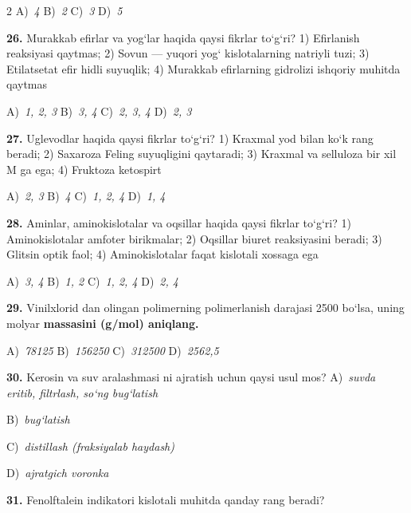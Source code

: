 \documentclass[11pt,a4paper]{article}
\begin{document}
\begin{multicols}{2}
\noindent A)~\textsl{4} \hfill B)~\textsl{2} \hfill C)~\textsl{3} \hfill D)~\textsl{5}\par
\vspace{4pt}
\noindent\textbf{26.} Murakkab efirlar va yog`lar haqida qaysi fikrlar to`g`ri? 1) Efirlanish reaksiyasi qaytmas; 2) Sovun --- yuqori yog` kislotalarning natriyli tuzi; 3) Etilatsetat efir hidli suyuqlik; 4) Murakkab efirlarning gidrolizi ishqoriy muhitda qaytmas

\noindent A)~\textsl{1, 2, 3} \hfill B)~\textsl{3, 4} \hfill C)~\textsl{2, 3, 4} \hfill D)~\textsl{2, 3}\par
\vspace{4pt}
\noindent\textbf{27.} Uglevodlar haqida qaysi fikrlar to`g`ri? 1) Kraxmal yod bilan ko`k rang beradi; 2) Saxaroza Feling suyuqligini qaytaradi; 3) Kraxmal va selluloza bir xil M ga ega; 4) Fruktoza ketospirt

\noindent A)~\textsl{2, 3} \hfill B)~\textsl{4} \hfill C)~\textsl{1, 2, 4} \hfill D)~\textsl{1, 4}\par
\vspace{4pt}
\noindent\textbf{28.} Aminlar, aminokislotalar va oqsillar haqida qaysi fikrlar to`g`ri? 1) Aminokislotalar amfoter birikmalar; 2) Oqsillar biuret reaksiyasini beradi; 3) Glitsin optik faol; 4) Aminokislotalar faqat kislotali xossaga ega

\noindent A)~\textsl{3, 4} \hfill B)~\textsl{1, 2} \hfill C)~\textsl{1, 2, 4} \hfill D)~\textsl{2, 4}\par
\vspace{4pt}
\noindent\textbf{29.} Vinilxlorid dan olingan polimerning polimerlanish darajasi 2500 bo`lsa, uning molyar \textbf{massasini (g/mol) aniqlang.}

\noindent A)~\textsl{78125} \hfill B)~\textsl{156250} \hfill C)~\textsl{312500} \hfill D)~\textsl{2562,5}\par
\vspace{4pt}
\noindent\textbf{30.} Kerosin va suv aralashmasi ni ajratish uchun qaysi usul mos?
\noindent A)~\textsl{suvda eritib, filtrlash, so`ng bug`latish}\par
\noindent B)~\textsl{bug`latish}\par
\noindent C)~\textsl{distillash (fraksiyalab haydash)}\par
\noindent D)~\textsl{ajratgich voronka}\par
\vspace{4pt}
\noindent\textbf{31.} Fenolftalein indikatori kislotali muhitda qanday rang beradi?


\end{multicols}
\end{document}
